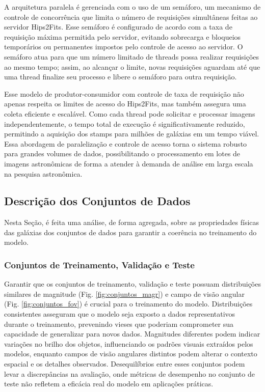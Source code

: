 A arquitetura paralela é gerenciada com o uso de um semáforo, um mecanismo de controle de concorrência que limita o número de requisições simultâneas feitas ao servidor Hips2Fits. Esse semáforo é configurado de acordo com a taxa de requisição máxima permitida pelo servidor, evitando sobrecarga e bloqueios temporários ou permanentes impostos pelo controle de acesso ao servidor. O semáforo atua para que um número limitado de threads possa realizar requisições ao mesmo tempo; assim, ao alcançar o limite, novas requisições aguardam até que uma thread finalize seu processo e libere o semáforo para outra requisição.

Esse modelo de produtor-consumidor com controle de taxa de requisição não apenas respeita os limites de acesso do Hips2Fits, mas também assegura uma coleta eficiente e escalável. Como cada thread pode solicitar e processar imagens independentemente, o tempo total de execução é significativamente reduzido, permitindo a aquisição dos stamps para milhões de galáxias em um tempo viável. Essa abordagem de paralelização e controle de acesso torna o sistema robusto para grandes volumes de dados, possibilitando o processamento em lotes de imagens astronômicas de forma a atender à demanda de análise em larga escala na pesquisa astronômica.





\subsection{Descrição dos Conjuntos de Dados}
\label{sec:aquisicao-descricao}

Nesta Seção, é feita uma análise, de forma agregada, sobre as propriedades físicas das galáxias dos conjuntos de dados para garantir a coerência no treinamento do modelo.

\subsubsection{Conjuntos de Treinamento, Validação e Teste}
\label{sec:aquisicao-treinamento}

Garantir que os conjuntos de treinamento, validação e teste possuam distribuições similares de magnitude (Fig. \ref{fig:conjuntos_magr}) e campo de visão angular (Fig. \ref{fig:conjuntos_fov}) é crucial para o treinamento do modelo. Distribuições consistentes asseguram que o modelo seja exposto a dados representativos durante o treinamento, prevenindo vieses que poderiam comprometer sua capacidade de generalizar para novos dados. Magnitudes diferentes podem indicar variações no brilho dos objetos, influenciando os padrões visuais extraídos pelos modelos, enquanto campos de visão angulares distintos podem alterar o contexto espacial e os detalhes observados. Desequilíbrios entre esses conjuntos podem levar a discrepâncias na avaliação, onde métricas de desempenho no conjunto de teste não refletem a eficácia real do modelo em aplicações práticas.

